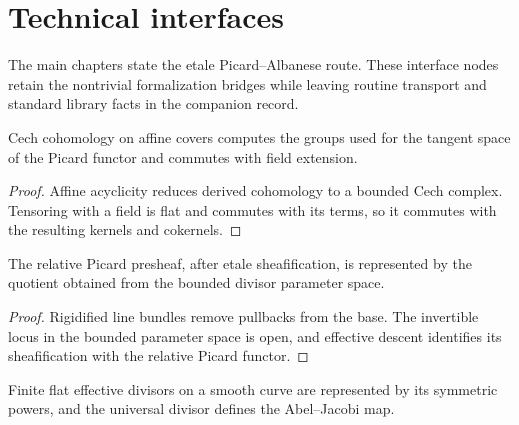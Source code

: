 \chapter{Technical interfaces}
\label{pa-app-technical}

The main chapters state the etale Picard--Albanese route.  These interface
nodes retain the nontrivial formalization bridges while leaving routine
transport and standard library facts in the companion record.

\begin{proposition}
  \label{pa-app-cohomology-interface}
  \cite{stacks-project}
  Cech cohomology on affine covers computes the groups used for the tangent
  space of the Picard functor and commutes with field extension.
\end{proposition}

\begin{proof}
  Affine acyclicity reduces derived cohomology to a bounded Cech complex.
  Tensoring with a field is flat and commutes with its terms, so it commutes
  with the resulting kernels and cokernels.
\end{proof}

\begin{proposition}
  \label{pa-app-etale-picard-interface}
  \cite{kleiman-picard}
  The relative Picard presheaf, after etale sheafification, is represented by
  the quotient obtained from the bounded divisor parameter space.
\end{proposition}

\begin{proof}
  Rigidified line bundles remove pullbacks from the base.  The invertible locus
  in the bounded parameter space is open, and effective descent identifies its
  sheafification with the relative Picard functor.
\end{proof}

\begin{proposition}
  \label{pa-app-divisor-interface}
  \cite{kleiman-picard,milne-av}
  Finite flat effective divisors on a smooth curve are represented by its
  symmetric powers, and the universal divisor defines the Abel--Jacobi map.
\end{proposition}


